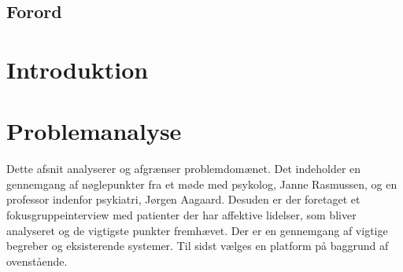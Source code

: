 %
%
%
%
% 



\pagestyle{empty} %
%
%
\listoftodos

\cleardoublepage

\section*{Forord}

\cleardoublepage

\pagestyle{fancy} %
\setcounter{tocdepth}{1}
\tableofcontents

%
\cleardoublepage

\chapter*{Introduktion}


\chapter{Problemanalyse}
Dette afsnit analyserer og afgrænser problemdomænet.
Det indeholder en gennemgang af nøglepunkter fra et møde med psykolog, Janne Rasmussen, og en professor indenfor psykiatri, Jørgen Aagaard.
Desuden er der foretaget et fokusgruppeinterview med patienter der har affektive lidelser, som bliver analyseret og de vigtigste punkter fremhævet.
Der er en gennemgang af vigtige begreber og eksisterende systemer.
Til sidst vælges en platform på baggrund af ovenstående.

